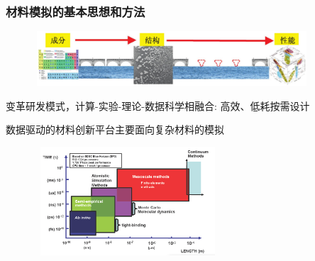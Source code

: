\frame
{
	\frametitle{材料模拟的基本思想和方法}
\begin{figure}[h!]
\vspace*{-0.25in}
\centering
\includegraphics[height=0.80in,width=4.05in]{Figures/MGE-2.png}
\label{MGE}
\end{figure}
\begin{minipage}[c]{0.30\textwidth}
\begin{itemize}%
\vspace*{-2.25in}
 {\fontsize{7.5pt}{6.0pt}\selectfont
	 \setlength{\itemsep}{10pt}
 \item 变革研发模式，计算-实验-理论-数据科学相融合: 高效、低耗按需设计
 \item 数据驱动的材料创新平台主要面向复杂材料的模拟}
 \end{itemize}
\end{minipage}
\hfill
\begin{minipage}[b]{0.68\textwidth}
\begin{figure}[h!]
\centering
\includegraphics[height=1.60in,width=2.75in]{Figures/Multi-Scale-6.png}
\label{Multi-Scale}
\end{figure}
\end{minipage}
}

